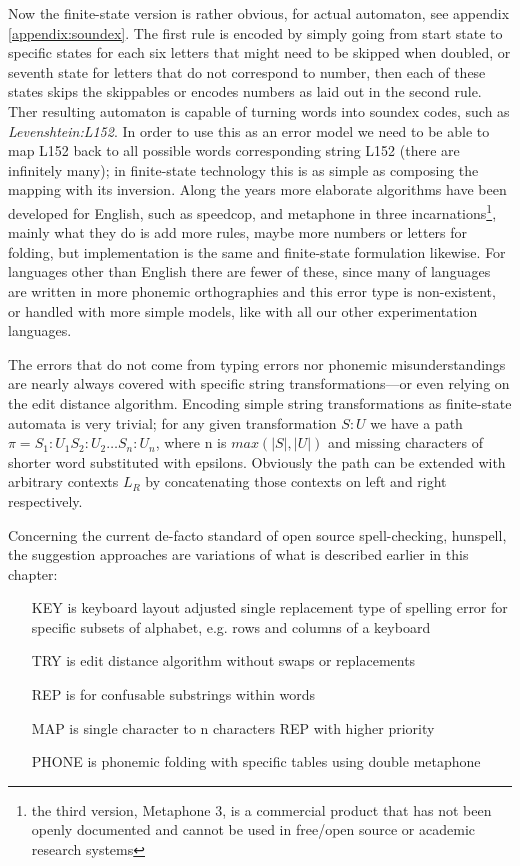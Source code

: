 \documentclass[a4paper,12pt]{article}
\begin{document}
Now the finite-state version is rather obvious, for actual automaton, see
appendix \ref{appendix:soundex}. The first rule is encoded by simply going from
start state to specific states for each six letters that might need to be
skipped when doubled, or seventh state for letters that do not correspond to
number, then each of these states skips the skippables or encodes numbers as
laid out in the second rule. Ther resulting automaton is capable of turning
words into soundex codes, such as \emph{Levenshtein:L152}. In order to use this
as an error model we need to be able to map L152 back to all possible words
corresponding string L152 (there are infinitely many); in finite-state
technology this is as simple as composing the mapping with its inversion. Along
the years more elaborate algorithms have been developed for English, such as
speedcop, and metaphone in three
incarnations\cite{philips1990hanging,philips2000double}\footnote{the third
version, Metaphone 3, is a commercial product that has not been openly
documented and cannot be used in free/open source or academic research
systems}, mainly what they do is add more rules, maybe more numbers or letters
for folding, but implementation is the same and finite-state formulation
likewise. For languages other than English there are fewer of these, since many
of languages are written in more phonemic orthographies and this error type is
non-existent, or handled with more simple models, like with all our other
experimentation languages.

The errors that do not come from typing errors nor phonemic misunderstandings
are nearly always covered with specific string transformations---or even
relying on the edit distance algorithm. Encoding simple string transformations
as finite-state automata is very trivial; for any given transformation $S:U$ we
have a path $\pi = S_1:U_1 S_2:U_2 \ldots S_n:U_n$, where n is $max(|S|, |U|)$
and missing characters of shorter word substituted with epsilons. Obviously the
path can be extended with arbitrary contexts $L _ R$ by concatenating those
contexts on left and right respectively. 

Concerning the current de-facto standard of open source spell-checking, 
hunspell, the suggestion approaches are variations of what is described earlier
in this chapter:

\begin{itemize}
    \item[KEY] is keyboard layout adjusted single replacement type of spelling
        error for specific subsets of alphabet, e.g. rows and columns of a
        keyboard
    \item[TRY] is edit distance algorithm without swaps or replacements
    \item[REP] is for confusable substrings within words
    \item[MAP] is single character to n characters REP with higher priority
    \item[PHONE] is phonemic folding with specific tables using double
        metaphone
\end{itemize}
\end{document}
